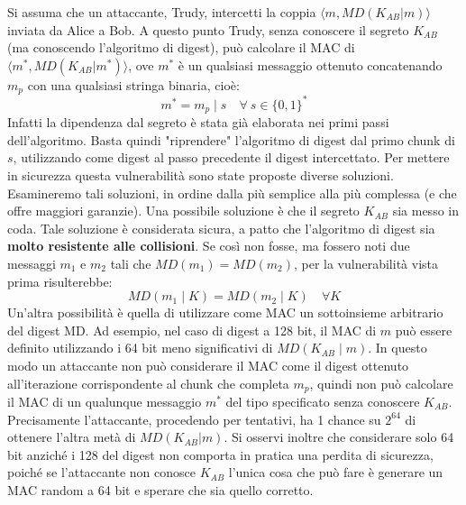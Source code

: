 Si assuma che un attaccante, Trudy, intercetti la coppia $\langle m, MD(K_{AB}|m) \rangle$ inviata da Alice a Bob. A questo punto Trudy, senza conoscere il segreto $K_{AB}$ (ma conoscendo l'algoritmo di digest), può calcolare il MAC di $\langle m^{*}, MD(K_{AB}|m^{*}) \rangle$, ove $m^{*}$ è un qualsiasi messaggio ottenuto concatenando $m_p$ con una qualsiasi stringa binaria, cioè:
\begin{equation}
m^{*} = m_p \mid s \quad \forall \: s \in \{0,1 \}^*
\end{equation}
Infatti la dipendenza dal segreto è stata già elaborata nei primi passi dell'algoritmo. Basta quindi "riprendere" l'algoritmo di digest dal primo chunk di $s$, utilizzando come digest al passo precedente il digest intercettato.
\newline \newline
Per mettere in sicurezza questa vulnerabilità sono state proposte diverse soluzioni. Esamineremo tali soluzioni, in ordine dalla più semplice alla più complessa (e che offre maggiori garanzie). 
\newline \newline
Una possibile soluzione è che il segreto $K_{AB}$ sia messo in coda. Tale soluzione è considerata sicura, a patto che l'algoritmo di digest sia \textbf{molto resistente alle collisioni}. Se così non fosse, ma fossero noti due messaggi $m_1$ e $m_2$ tali che $MD(m_1) = MD(m_2)$, per la vulnerabilità vista prima risulterebbe:
\begin{equation}
MD(m_1 \mid K) = MD(m_2 \mid K) \quad \forall K
\end{equation}
\newline
Un'altra possibilità è quella di utilizzare come MAC un sottoinsieme arbitrario del digest MD. Ad esempio, nel caso di digest a 128 bit, il MAC di $m$ può essere definito utilizzando i 64 bit meno significativi di $MD(K_{AB} \mid m)$. In questo modo un attaccante non può considerare il MAC come il digest ottenuto all'iterazione corrispondente al chunk che completa $m_p$, quindi non può calcolare il MAC di un qualunque messaggio
$m^{*}$ del tipo specificato senza conoscere $K_{AB}$. Precisamente l'attaccante, procedendo per tentativi, ha 1
chance su $2^{64}$ di ottenere l'altra metà di $MD(K_{AB}|m)$. Si osservi inoltre che considerare solo 64 bit
anziché i 128 del digest non comporta in pratica una perdita di sicurezza, poiché se l'attaccante non conosce $K_{AB}$ l'unica cosa che può fare è generare un MAC random a 64 bit e sperare che sia quello corretto.
\newline \newline 
